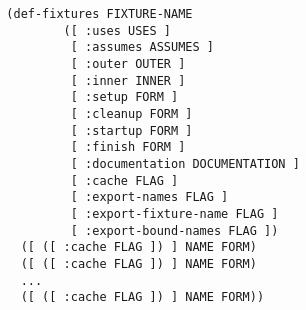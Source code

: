 \begin{verbatim}
  (def-fixtures FIXTURE-NAME
          ([ :uses USES ]
           [ :assumes ASSUMES ]
           [ :outer OUTER ]
           [ :inner INNER ]
           [ :setup FORM ]
           [ :cleanup FORM ]
           [ :startup FORM ]
           [ :finish FORM ]
           [ :documentation DOCUMENTATION ]
           [ :cache FLAG ]
           [ :export-names FLAG ]
           [ :export-fixture-name FLAG ]
           [ :export-bound-names FLAG ])
    ([ ([ :cache FLAG ]) ] NAME FORM)
    ([ ([ :cache FLAG ]) ] NAME FORM)
    ...
    ([ ([ :cache FLAG ]) ] NAME FORM))
\end{verbatim}

